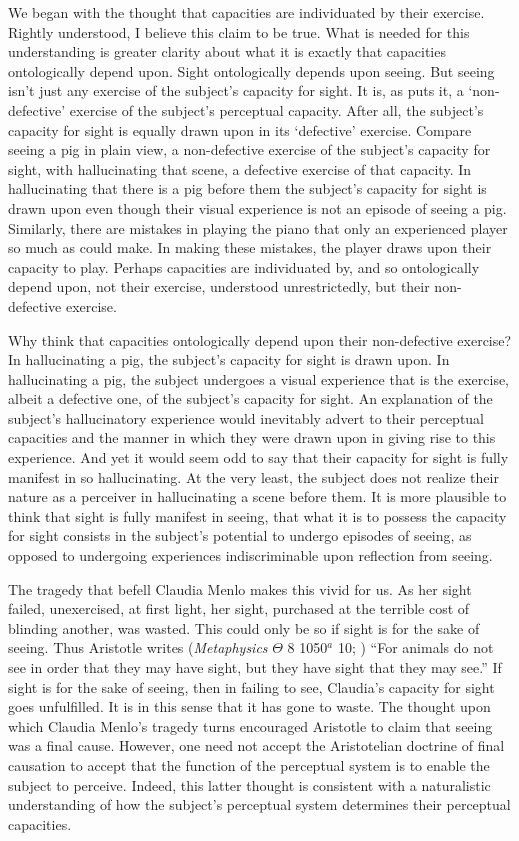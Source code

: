 \documentclass[12pt]{article}
\begin{document}
We began with the thought that capacities are individuated by their exercise. Rightly understood, I believe this claim to be true. What is needed for this understanding is greater clarity about what it is exactly that capacities ontologically depend upon. Sight ontologically depends upon seeing. But seeing isn't just any exercise of the subject's capacity for sight. It is, as \citet{McDowell:2010fk} puts it, a `non-defective' exercise of the subject's perceptual capacity. After all, the subject's capacity for sight is equally drawn upon in its `defective' exercise. Compare seeing a pig in plain view, a non-defective exercise of the subject's capacity for sight, with hallucinating that scene, a defective exercise of that capacity. In hallucinating that there is a pig before them the subject's capacity for sight is drawn upon even though their visual experience is not an episode of seeing a pig. Similarly, there are mistakes in playing the piano that only an experienced player so much as could make. In making these mistakes, the player draws upon their capacity to play. Perhaps capacities are individuated by, and so ontologically depend upon, not their exercise, understood unrestrictedly, but their non-defective exercise.

Why think that capacities ontologically depend upon their non-defective exercise? In hallucinating a pig, the subject's capacity for sight is drawn upon. In hallucinating a pig, the subject undergoes a visual experience that is the exercise, albeit a defective one, of the subject's capacity for sight. An explanation of the subject's hallucinatory experience would inevitably advert to their perceptual capacities and the manner in which they were drawn upon in giving rise to this experience. And yet it would seem odd to say that their capacity for sight is fully manifest in so hallucinating. At the very least, the subject does not realize their nature as a perceiver in hallucinating a scene before them. It is more plausible to think that sight is fully manifest in seeing, that what it is to possess the capacity for sight consists in the subject's potential to undergo episodes of seeing, as opposed to undergoing experiences indiscriminable upon reflection from seeing.

The tragedy that befell Claudia Menlo makes this vivid for us. As her sight failed, unexercised, at first light, her sight, purchased at the terrible cost of blinding another, was wasted. This could only be so if sight is for the sake of seeing. Thus Aristotle writes (\emph{Metaphysics} \( \Theta \) 8 1050\( ^{a} \) 10; \citealt{Barnes:1984kx}) ``For animals do not see in order that they may have sight, but they have sight that they may see.'' If sight is for the sake of seeing, then in failing to see, Claudia's capacity for sight goes unfulfilled. It is in this sense that it has gone to waste. The thought upon which Claudia Menlo's tragedy turns encouraged Aristotle to claim that seeing was a final cause. However, one need not accept the Aristotelian doctrine of final causation to accept that the function of the perceptual system is to enable the subject to perceive. Indeed, this latter thought is consistent with a naturalistic understanding of how the subject's perceptual system determines their perceptual capacities.
\end{document}
